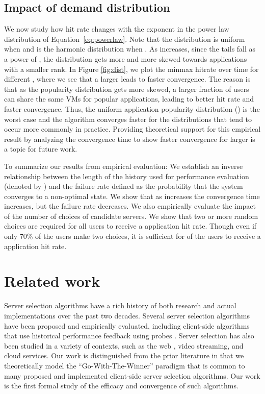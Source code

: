 \documentclass[conference]{IEEEtran}
\begin{document}
\subsection{Impact of demand distribution}



We now study  how hit rate changes with the exponent  in the power law distribution of Equation~\ref{eq:powerlaw}.  Note that the distribution is uniform when  and is the harmonic distribution when .  As  increases, since the tails fall as a power of ,  the distribution gets more and more skewed towards applications with a smaller rank. In  Figure \ref{fig:dist}, we plot the minmax hitrate over  time for different , where we see that a larger  leads to faster convergence. The reason is that as the popularity distribution gets more skewed, a larger fraction of users can share the same VMs for popular applications, leading to better hit rate and faster convergence. 
Thus, the uniform application popularity distribution ()  is the worst case and the algorithm converges faster for the distributions that tend to occur more commonly in practice. Providing theoretical support for this empirical result by analyzing the convergence time to show faster convergence for larger  is a topic for future work.

To summarize our results from empirical evaluation: We establish an inverse relationship between the length of the history used for performance evaluation (denoted by  ) and the failure rate defined as the probability that the system converges to a non-optimal state. We show that as  increases the convergence time increases, but the failure rate decreases. We  also empirically evaluate the impact of the number of choices of candidate servers. We show that two or more random choices are required for all users to receive a  application hit rate. Though even if only  70\% of the users  make two choices,  it is sufficient for   of the users to receive a  application hit rate. 



\section{Related work}
Server selection algorithms have a rich history of both research and actual implementations over the past two decades. Several server selection algorithms have been proposed and empirically evaluated, including client-side algorithms that use historical performance feedback using probes \cite{dykes2000empirical,crovella1995dynamic}.  Server selection has also been studied in a variety of contexts, such as  the web \cite{crovella1995dynamic,sayal1998selection}, video streaming\cite{torres2011dissecting}, and cloud services\cite{wendell2010donar}. Our work is distinguished from the prior literature in that we theoretically model the ``Go-With-The-Winner'' paradigm that is common to many proposed and implemented client-side server selection algorithms. Our work is the first formal study of the efficacy and convergence of such algorithms.
\end{document}
